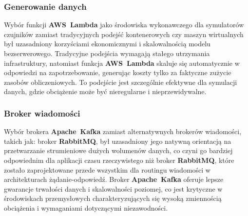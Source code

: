 \subsubsection{Generowanie danych}

Wybór funkcji \textbf{\mbox{AWS Lambda}} \cite{aws_lambda_docs} jako środowiska wykonawczego dla symulatorów czujników zamiast tradycyjnych podejść kontenerowych czy maszyn wirtualnych był uzasadniony korzyściami ekonomicznymi i skalowalnością modelu bezserwerowego. Tradycyjne podejścia wymagają stałego utrzymania infrastruktury, natomiast funkcja \textbf{\mbox{AWS Lambda}} skaluje się automatycznie w odpowiedzi na zapotrzebowanie, generując koszty tylko za faktyczne zużycie zasobów obliczeniowych. To podejście jest szczególnie efektywne dla symulacji danych, gdzie obciążenie może być nieregularne i nieprzewidywalne.

\subsubsection{Broker wiadomości}

Wybór brokera \textbf{\mbox{Apache Kafka}} \cite{kafka} zamiast alternatywnych brokerów wiadomości, takich jak: broker \textbf{\mbox{RabbitMQ}}, był uzasadniony jego natywną orientacją na przetwarzanie strumieniowe dużych wolumenów danych, co czyni go bardziej odpowiednim dla aplikacji czasu rzeczywistego niż broker \textbf{\mbox{RabbitMQ}}, które zostało zaprojektowane przede wszystkim dla routingu wiadomości w architekturach żądanie-odpowiedź.  Broker \textbf{\mbox{Apache Kafka}} oferuje lepsze gwarancje trwałości danych i skalowalności poziomej, co jest krytyczne w środowiskach przemysłowych charakteryzujących się wysoką zmiennością obciążenia i wymaganiami dotyczącymi niezawodności.
